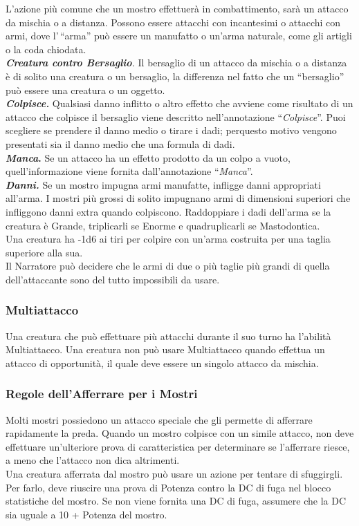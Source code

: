 L'azione più comune che un mostro effettuerà in combattimento, sarà un attacco da mischia o a distanza. Possono essere attacchi con incantesimi o attacchi con armi, dove l'\,``arma'' può essere un manufatto o un'arma naturale, come gli artigli o la coda chiodata.\\
\emph{\textbf{Creatura contro Bersaglio}.} Il bersaglio di un attacco da mischia o a distanza è di solito una creatura o un bersaglio, la differenza nel fatto che un ``bersaglio'' può essere una creatura o un oggetto.\\
\emph{\textbf{Colpisce.}} Qualsiasi danno inflitto o altro effetto che avviene come risultato di un attacco che colpisce il bersaglio viene descritto nell'annotazione ``\emph{Colpisce}''. Puoi scegliere se prendere il danno medio o tirare i dadi; perquesto  motivo vengono presentati sia il danno medio che una formula di dadi. \\
\textbf{\emph{Manca}.} Se un attacco ha un effetto prodotto da un colpo a vuoto, quell'informazione viene fornita dall'annotazione ``\emph{Manca}''.\\
\emph{\textbf{Danni.}} Se un mostro impugna armi manufatte, infligge danni appropriati all'arma. I mostri più grossi di solito impugnano armi di dimensioni superiori che infliggono danni extra quando colpiscono. Raddoppiare i dadi dell'arma se la creatura è Grande, triplicarli se Enorme e quadruplicarli se Mastodontica.\\
Una creatura ha -1d6 ai tiri per colpire con un'arma costruita per una taglia superiore alla sua. \\
Il Narratore può decidere che le armi di due o più taglie più grandi di quella dell'attaccante sono del tutto impossibili da usare.

\subsubsection{Multiattacco}

Una creatura che può effettuare più attacchi durante il suo turno ha l'abilità Multiattacco. Una creatura non può usare Multiattacco quando effettua un attacco di opportunità, il quale deve essere un singolo attacco da mischia.

\subsubsection{Regole dell'Afferrare per i Mostri}

Molti mostri possiedono un attacco speciale che gli permette di afferrare rapidamente la preda. Quando un mostro colpisce con un simile attacco, non deve effettuare un'ulteriore prova di caratteristica per determinare se l'afferrare riesce, a meno che l'attacco non dica altrimenti.\\
Una creatura afferrata dal mostro può usare un azione per tentare di sfuggirgli. Per farlo, deve riuscire una prova di Potenza contro la DC di fuga nel blocco statistiche del
mostro. Se non viene fornita una DC di fuga, assumere che la DC sia uguale a 10 + Potenza del mostro.

